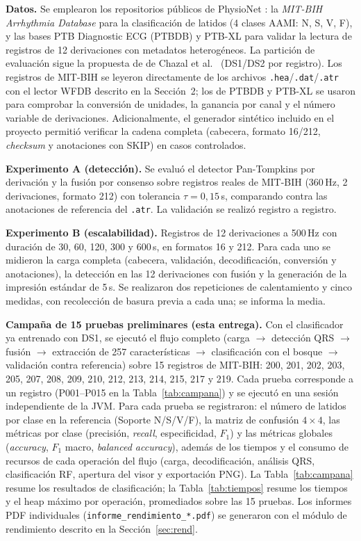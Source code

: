 \textbf{Datos.} Se emplearon los repositorios públicos de PhysioNet
\cite{goldberger2000}: la \emph{MIT-BIH Arrhythmia Database}
\cite{moody2001} para la clasificación de latidos (4 clases AAMI: N, S,
V, F), y las bases PTB Diagnostic ECG (PTBDB) y PTB-XL \cite{wagner2020}
para validar la lectura de registros de 12 derivaciones con metadatos
heterogéneos. La partición de evaluación sigue la propuesta de de Chazal
et al.~\cite{dechazal2004} (DS1/DS2 por registro). Los registros de
MIT-BIH se leyeron directamente de los archivos \texttt{.hea}/\texttt{.dat}/\texttt{.atr}
con el lector WFDB descrito en la Sección~2; los de PTBDB y PTB-XL se
usaron para comprobar la conversión de unidades, la ganancia por canal y
el número variable de derivaciones. Adicionalmente, el generador
sintético incluido en el proyecto permitió verificar la cadena completa
(cabecera, formato 16/212, \emph{checksum} y anotaciones con SKIP) en
casos controlados.

\textbf{Experimento A (detección).} Se evaluó el detector Pan-Tompkins
por derivación y la fusión por consenso sobre registros reales de
MIT-BIH (360\,Hz, 2 derivaciones, formato 212) con tolerancia
$\tau=0{,}15$\,s, comparando contra las anotaciones de referencia del
\texttt{.atr}. La validación se realizó registro a registro.

\textbf{Experimento B (escalabilidad).} Registros de 12 derivaciones a
500\,Hz con duración de 30, 60, 120, 300 y 600\,s, en formatos 16 y 212.
Para cada uno se midieron la carga completa (cabecera, validación,
decodificación, conversión y anotaciones), la detección en las 12
derivaciones con fusión y la generación de la impresión estándar de
5\,s. Se realizaron dos repeticiones de calentamiento y cinco medidas,
con recolección de basura previa a cada una; se informa la media.

\textbf{Campaña de 15 pruebas preliminares (esta entrega).} Con el
clasificador ya entrenado con DS1, se ejecutó el flujo completo
(carga $\rightarrow$ detección QRS $\rightarrow$ fusión $\rightarrow$
extracción de 257 características $\rightarrow$ clasificación con el
bosque $\rightarrow$ validación contra referencia) sobre 15 registros
de MIT-BIH: 200, 201, 202, 203, 205, 207, 208, 209, 210, 212, 213, 214,
215, 217 y 219. Cada prueba corresponde a un registro (P001--P015 en la
Tabla~\ref{tab:campana}) y se ejecutó en una sesión independiente de la
JVM. Para cada prueba se registraron: el número de latidos por clase en
la referencia (Soporte N/S/V/F), la matriz de confusión $4\times4$, las
métricas por clase (precisión, \emph{recall}, especificidad, $F_1$) y
las métricas globales (\emph{accuracy}, $F_1$ macro, \emph{balanced
accuracy}), además de los tiempos y el consumo de recursos de cada
operación del flujo (carga, decodificación, análisis QRS, clasificación
RF, apertura del visor y exportación PNG). La Tabla~\ref{tab:campana}
resume los resultados de clasificación; la Tabla~\ref{tab:tiempos}
resume los tiempos y el heap máximo por operación, promediados sobre las
15 pruebas. Los informes PDF individuales
(\texttt{informe\_rendimiento\_*.pdf}) se generaron con el módulo de
rendimiento descrito en la Sección~\ref{sec:rend}.


